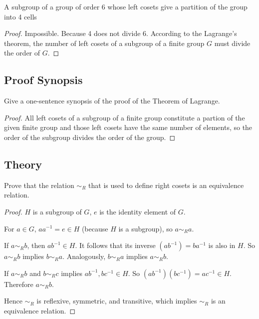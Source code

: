 \begin{exercise}
    A subgroup of a group of order 6 whose left cosets give a partition of the group into 4 cells
\end{exercise}

\begin{proof}
    Impossible. Because 4 does not divide 6. According to the Lagrange's theorem, the number of left cosets of a subgroup of a finite group $G$ must divide the order of $G$.
\end{proof}

\subsection*{Proof Synopsis}

\begin{exercise}
    Give a one-sentence synopsis of the proof of the Theorem of Lagrange.
\end{exercise}

\begin{proof}
    All left cosets of a subgroup of a finite group constitute a partion of the given finite group and those left cosets have the same number of elements, so the order of the subgroup divides the order of the group.
\end{proof}

\subsection*{Theory}

\begin{exercise}
    Prove that the relation ${\sim}_{R}$ that is used to define right cosets is an equivalence relation.
\end{exercise}

\begin{proof}
    $H$ is a subgroup of $G$, $e$ is the identity element of $G$.

    For $a\in G$, $aa^{-1} = e\in H$ (because $H$ is a subgroup), so $a {\sim}_{R} a$.

    If $a {\sim}_{R} b$, then $ab^{-1}\in H$. It follows that its inverse ${(ab^{-1})} = ba^{-1}$ is also in $H$. So $a {\sim}_{R} b$ implies $b {\sim}_{R} a$. Analogously, $b {\sim}_{R} a$ implies $a {\sim}_{R} b$.

    If $a {\sim}_{R} b$ and $b {\sim}_{R} c$ implies $ab^{-1}, bc^{-1}\in H$. So $(ab^{-1})(bc^{-1}) = ac^{-1}\in H$. Therefore $a {\sim}_{R} b$.

    Hence ${\sim}_{R}$ is reflexive, symmetric, and transitive, which implies ${\sim}_{R}$ is an equivalence relation.
\end{proof}

